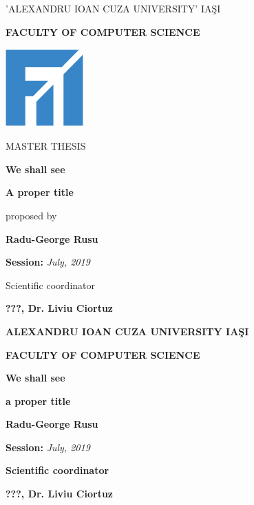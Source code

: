 \documentclass[a4paper, 12pt, oneside]{Thesis}  %
\begin{document}
\pagestyle{empty}
\centerline{\small{'ALEXANDRU IOAN CUZA UNIVERSITY' IA\c SI}}
\vspace{0.5cm}
\centerline{\textbf{\Large{\textsf{FACULTY OF COMPUTER SCIENCE}}}}
\vspace{3cm}
\begin{center}
	\includegraphics[width=3cm,height=3cm]{Pictures/fii-01.png}
\end{center}
\vspace{3cm}
\centerline{\Large{MASTER THESIS}}
\vspace{1cm}
\centerline{\textbf{\LARGE{We shall see}}}
\vspace{0.2cm}
\centerline{\textbf{\LARGE{A proper title}}}
\vspace{1cm}
\centerline{proposed by}
\vspace{1cm}
\centerline{\textbf{\Large{\textsf{Radu-George Rusu}}}}
\vspace{2cm}
\centerline{\textsf{\textbf{Session:} \textit{July, 2019}}}
\vspace{0.5cm}
\centerline{Scientific coordinator}
\vspace{0.5cm}
\centerline{\textsf{\textbf{\large{???, Dr. Liviu Ciortuz}}}}

\clearpage

\pagestyle{empty}
\centerline{\textbf{\large{\textsf{ALEXANDRU IOAN CUZA UNIVERSITY IA\c SI}}}}
\vspace{0.5cm}
\centerline{\textbf{\large{\textsf{FACULTY OF COMPUTER SCIENCE}}}}
\vspace{5cm}
\centerline{\textbf{\LARGE{We shall see}}}
\vspace{0.2cm}
\centerline{\textbf{\LARGE{a proper title}}}
\vspace{3cm}
\centerline{\textbf{\Large{\textsf{Radu-George Rusu}}}}
\vspace{2cm}
\centerline{\Large{{\textsf{\textbf{Session:} \textit{July, 2019}}}}}
\vspace{4.5cm}
\centerline{\textbf{Scientific coordinator}}
\vspace{0.5cm}
\centerline{\textsf{\textbf{\large{???, Dr. Liviu Ciortuz}}}}
\end{document}
